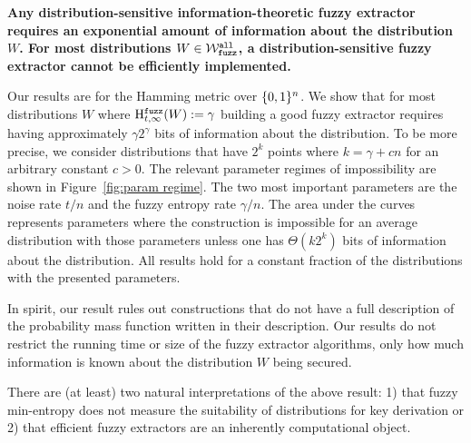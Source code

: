 \begin{displayquote}
\textbf{Any distribution-sensitive information-theoretic fuzzy extractor requires an exponential amount of information about the distribution $W$.  For most distributions $W \in \mathcal{W}_{\mathtt{fuzz}}^{\mathtt{all}}$, a distribution-sensitive fuzzy extractor cannot be efficiently implemented.} 
\end{displayquote} 
Our results are for the Hamming metric over $\{0, 1\}^n$. We show that for most distributions $W$ where $\mathrm{H}^{\mathtt{fuzz}}_{t,\infty}(W) := \gamma$ building a good fuzzy extractor requires having approximately $\gamma 2^\gamma$ bits of information about the distribution. To be more precise,  we consider distributions that have $2^k$ points where $k = \gamma + c n$ for an arbitrary constant $c>0$. 
The relevant parameter regimes of impossibility are shown in Figure~\ref{fig:param regime}.  The two most important parameters are the noise rate $t/n$ and the fuzzy entropy rate $\gamma/n$. The area under the curves represents parameters where the construction is impossible for an average distribution with those parameters unless one has $\Theta(k 2^k)$ bits of information about the distribution.  All results hold for a constant fraction of the distributions with the presented parameters.

In spirit, our result rules out constructions that do not have a full description of the probability mass function written in their description.  Our results do not restrict the running time or size of the fuzzy extractor algorithms, only how much information is known about the distribution $W$ being secured.  





There are (at least) two natural interpretations of the above result: 1) that fuzzy min-entropy does not measure the suitability of distributions for key derivation or 2) that efficient fuzzy extractors are an inherently computational object.

